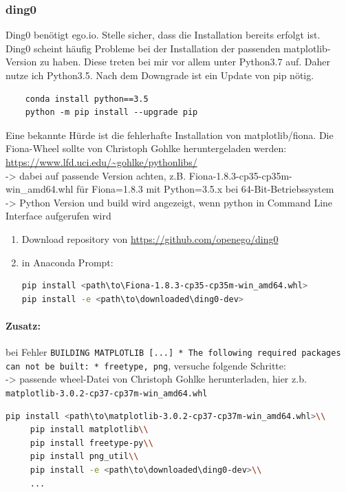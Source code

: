 \documentclass[
a4paper,     %
12pt         %
]{scrartcl}  %
\begin{document}
\subsubsection{ding0}
Ding0 benötigt ego.io. Stelle sicher, dass die Installation bereits erfolgt ist.\\
Ding0 scheint häufig Probleme bei der Installation der passenden matplotlib-Version zu haben. Diese treten bei mir vor allem unter Python3.7 auf. Daher nutze ich Python3.5. Nach dem Downgrade ist ein Update von pip nötig.
\begin{lstlisting}
	conda install python==3.5
	python -m pip install --upgrade pip
\end{lstlisting}

Eine bekannte Hürde ist die fehlerhafte Installation von matplotlib/fiona. Die Fiona-Wheel sollte von Christoph Gohlke heruntergeladen werden: \url{https://www.lfd.uci.edu/~gohlke/pythonlibs/}
\\-> dabei auf passende Version achten, z.B. Fiona-1.8.3-cp35-cp35m-win\_amd64.whl für Fiona=1.8.3 mit Python=3.5.x bei 64-Bit-Betriebssystem
\\-> Python Version und build wird angezeigt, wenn python in Command Line Interface aufgerufen wird
\begin{enumerate}
	\item Download repository von \url{https://github.com/openego/ding0}
	\item in Anaconda Prompt:
\begin{lstlisting}[language=bash]
pip install <path\to\Fiona-1.8.3-cp35-cp35m-win_amd64.whl>
pip install -e <path\to\downloaded\ding0-dev>
\end{lstlisting}
\end{enumerate}

\paragraph{Zusatz: } bei Fehler \texttt{BUILDING MATPLOTLIB [...] * The following required packages can not be built: * freetype, png}, versuche folgende Schritte:\\
-> passende wheel-Datei von Christoph Gohlke herunterladen, hier z.b. \texttt{matplotlib-3.0.2-cp37-cp37m-win\_amd64.whl}\\
\begin{lstlisting}[language=bash]
	 pip install <path\to\matplotlib-3.0.2-cp37-cp37m-win_amd64.whl>\\
	 pip install matplotlib\\
	 pip install freetype-py\\
	 pip install png_util\\
	 pip install -e <path\to\downloaded\ding0-dev>\\
	 ...
\end{lstlisting}
\end{document}
